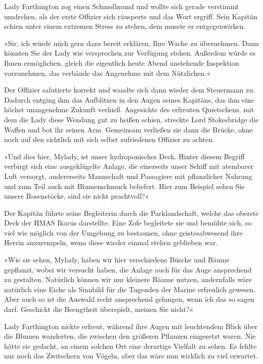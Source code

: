 Lady Farthington zog einen Schmollmund und wollte sich gerade
verstimmt umdrehen, als der erste Offizier sich räusperte und das
Wort ergriff. Sein Kapitän schien unter einem extremen Stress zu
stehen, dem musste er entgegenwirken.

»Sir, ich würde mich gern dazu bereit erklären, Ihre Wache zu
übernehmen. Dann könnten Sie der Lady wie versprochen zur Verfügung
stehen. Außerdem würde es Ihnen ermöglichen, gleich die eigentlich
heute Abend anstehende Inspektion vorzunehmen, das verbände das
Angenehme mit dem Nützlichen.«

\bigpar

Der Offizier salutierte korrekt und wandte sich dann wieder dem
Steuermann zu. Dadurch entging ihm das Aufblitzen in den Augen
seines Kapitäns, das ihm eine höchst unangenehme Zukunft verhieß.
Angesichts des erfreuten Quietschens, mit dem die Lady diese
Wendung gut zu heißen schien, streckte Lord Stokesbridge die Waffen
und bot ihr seinen Arm. Gemeinsam verließen sie dann die Brücke,
ohne noch auf den sichtlich mit sich selbst zufriedenen Offizier zu
achten.

\tb

»Und dies hier, Mylady, ist unser hydroponisches Deck. Hinter
diesem Begriff verbirgt sich eine ausgeklügelte Anlage, die
einerseits unser Schiff mit atembarer Luft versorgt, andererseits
Mannschaft und Passagiere mit pflanzlicher Nahrung und zum Teil
auch mit Blumenschmuck beliefert. Hier zum Beispiel sehen Sie
unsere Rosenstöcke, sind sie nicht prachtvoll?«

Der Kapitän führte seine Begleiterin durch die Parklandschaft,
welche das oberste Deck der HMAS Ikarus darstellte. Eine Zofe
begleitete sie und bemühte sich, so viel wie möglich von der
Umgebung zu bestaunen, ohne geistesabwesend ihre Herrin
anzurempeln, wenn diese wieder einmal stehen geblieben war.

»Wie sie sehen, Mylady, haben wir hier verschiedene Büsche und
Bäume gepflanzt, wobei wir versucht haben, die Anlage auch für das
Auge ansprechend zu gestalten. Natürlich können wir nur kleinere
Bäume nutzen, andernfalls wäre natürlich eine Eiche als Sinnbild
für die Tugenden der Marine erfreulich gewesen. Aber auch so ist
die Auswahl recht ansprechend gelungen, wenn ich das so sagen darf.
Geschickt die Beengtheit überspielt, meinen Sie nicht?«

Lady Farthington nickte erfreut, während ihre Augen mit leuchtendem
Blick über die Blumen wanderten, die zwischen den größeren Pflanzen
eingesetzt waren. Nie hätte sie gedacht, an einem solchen Ort eine
derartige Vielfalt zu sehen. Es fehlte nur noch das Zwitschern von
Vögeln, aber das wäre nun wirklich zu viel erwartet.

